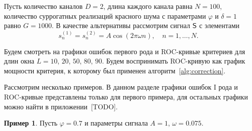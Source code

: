 \documentclass[specialist,
substylefile = spbu_report.rtx,
subf,href,colorlinks=true, 12pt]{disser}
\theoremstyle{definition}
\newtheorem{example}{Пример}
\begin{document}
Пусть количество каналов $D=2$, длина каждого канала равна $N=100$, количество суррогатных реализаций красного шума с параметрами $\varphi$ и $\delta=1$ равно $G=1000$. В качестве альтернативы рассмотрим сигнал $\mathsf{S}$ с элементами
\[
s_n^{(1)}=s_n^{(2)}=A\cos(2\pi\omega n),\quad n=1,\ldots, N.
\]

Будем смотреть на графики ошибок первого рода и ROC-кривые критериев для длин окна $L=10$, $20$, $50$, $80$, $90$. Будем воспринимать ROC-кривую как график мощности критерия, к которому был применен алгоритм~\ref{alg:correction}. 

Рассмотрим несколько примеров. В данном разделе графики ошибок I рода и ROC-кривые представлены только для первого примера, для остальных графики можно найти в приложении~[TODO].

\begin{example}\label{mc-mssa_example1}
	Пусть $\varphi=0.7$ и параметры сигнала $A=1$, $\omega=0.075$.


\end{example}
\end{document}
